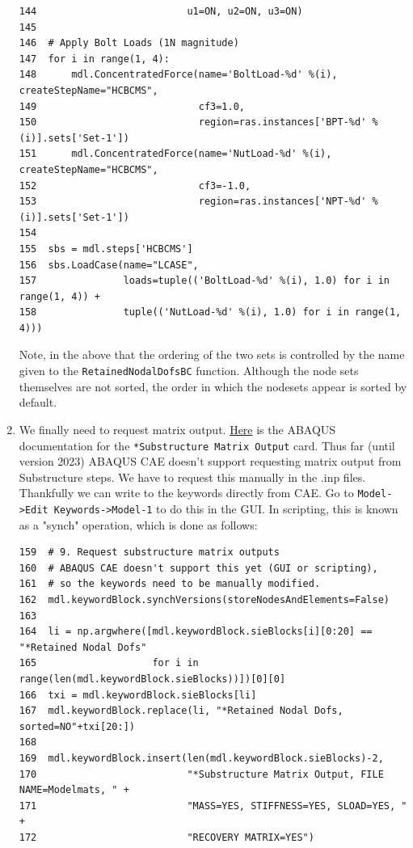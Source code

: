 \documentclass[11pt]{article}
\begin{document}
\begin{enumerate}
\begin{verbatim}
144                          u1=ON, u2=ON, u3=ON)
145  
146  # Apply Bolt Loads (1N magnitude)
147  for i in range(1, 4):
148      mdl.ConcentratedForce(name='BoltLoad-%d' %(i), createStepName="HCBCMS",
149                            cf3=1.0,
150                            region=ras.instances['BPT-%d' %(i)].sets['Set-1'])
151      mdl.ConcentratedForce(name='NutLoad-%d' %(i), createStepName="HCBCMS",
152                            cf3=-1.0,
153                            region=ras.instances['NPT-%d' %(i)].sets['Set-1'])
154  
155  sbs = mdl.steps['HCBCMS']
156  sbs.LoadCase(name="LCASE",
157               loads=tuple(('BoltLoad-%d' %(i), 1.0) for i in range(1, 4)) +
158               tuple(('NutLoad-%d' %(i), 1.0) for i in range(1, 4)))
\end{verbatim}
Note, in the above that the ordering of the two sets is controlled by the name given to the \texttt{RetainedNodalDofsBC} function.
Although the node sets themselves are not sorted, the order in which the nodesets appear is sorted by default.
\item We finally need to request matrix output.
\href{https://classes.engineering.wustl.edu/2009/spring/mase5513/abaqus/docs/v6.6/books/key/default.htm?startat=ch18abk43.html}{Here} is the ABAQUS documentation for the \texttt{*Substructure Matrix Output} card.
Thus far (until version 2023) ABAQUS CAE doesn't support requesting matrix output from Substructure steps.
We have to request this manually in the .inp files.
Thankfully we can write to the keywords directly from CAE.
Go to \texttt{Model->Edit Keywords->Model-1} to do this in the GUI.
In scripting, this is known as a "synch" operation, which is done as follows:
\begin{verbatim}
159  # 9. Request substructure matrix outputs
160  # ABAQUS CAE doesn't support this yet (GUI or scripting),
161  # so the keywords need to be manually modified.
162  mdl.keywordBlock.synchVersions(storeNodesAndElements=False)
163  
164  li = np.argwhere([mdl.keywordBlock.sieBlocks[i][0:20] == "*Retained Nodal Dofs"
165                    for i in range(len(mdl.keywordBlock.sieBlocks))])[0][0]
166  txi = mdl.keywordBlock.sieBlocks[li]
167  mdl.keywordBlock.replace(li, "*Retained Nodal Dofs, sorted=NO"+txi[20:])
168  
169  mdl.keywordBlock.insert(len(mdl.keywordBlock.sieBlocks)-2, 
170                          "*Substructure Matrix Output, FILE NAME=Modelmats, " +
171                          "MASS=YES, STIFFNESS=YES, SLOAD=YES, " +
172                          "RECOVERY MATRIX=YES")
\end{verbatim}

\end{enumerate}
\end{document}
